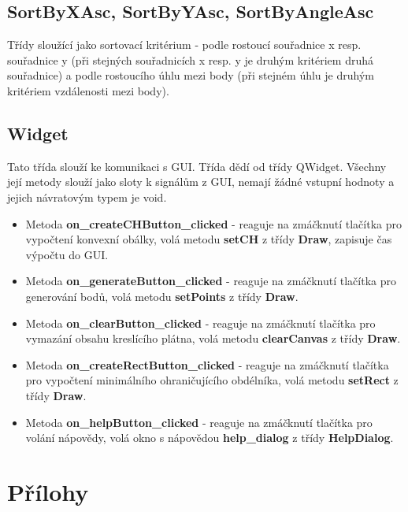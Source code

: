 \documentclass[a4paper, 12pt]{article}
\begin{document}
\subsection{SortByXAsc, SortByYAsc, SortByAngleAsc}
Třídy sloužící jako sortovací kritérium - podle rostoucí souřadnice x resp. souřadnice y (při stejných souřadnicích x resp. y je druhým kritériem druhá souřadnice) a podle rostoucího úhlu mezi body (při stejném úhlu je druhým kritériem vzdálenosti mezi body).
\clearpage

\subsection{Widget}
Tato třída slouží ke komunikaci s GUI. Třída dědí od třídy QWidget. Všechny její metody slouží jako sloty k signálům z GUI, nemají žádné vstupní hodnoty a jejich návratovým typem je void. 

\begin{itemize}
	\item Metoda \textbf{on\_createCHButton\_clicked} - reaguje na zmáčknutí tlačítka pro vypočtení konvexní obálky, volá metodu \textbf{setCH} z třídy \textbf{Draw}, zapisuje čas výpočtu do GUI.

	\item Metoda \textbf{on\_generateButton\_clicked} - reaguje na zmáčknutí tlačítka pro generování bodů, volá metodu \textbf{setPoints} z třídy \textbf{Draw}.

	\item Metoda \textbf{on\_clearButton\_clicked} - reaguje na zmáčknutí tlačítka pro vymazání obsahu kreslícího plátna, volá metodu \textbf{clearCanvas} z třídy \textbf{Draw}.

	\item Metoda \textbf{on\_createRectButton\_clicked} - reaguje na zmáčknutí tlačítka pro vypočtení minimálního ohraničujícího obdélníka, volá metodu \textbf{setRect} z třídy \textbf{Draw}.

	\item Metoda \textbf{on\_helpButton\_clicked} - reaguje na zmáčknutí tlačítka pro volání nápovědy, volá okno s nápovědou \textbf{help\_dialog} z třídy \textbf{HelpDialog}.

\end{itemize} 

\clearpage

\section{Přílohy}
\end{document}
